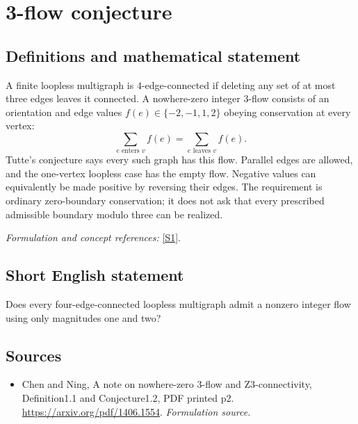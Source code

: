 \documentclass[11pt]{article}
\begin{document}
\section*{\texorpdfstring{3-flow conjecture}{3-flow conjecture}}\label{3216}
\subsection{Definitions and mathematical statement}
A finite loopless multigraph is $4$-edge-connected if deleting any set of at most three edges leaves it connected. A nowhere-zero integer $3$-flow consists of an orientation and edge values $f(e)\in\{-2,-1,1,2\}$ obeying conservation at every vertex:
\[
 \sum_{e\text{ enters }v} f(e)=\sum_{e\text{ leaves }v}f(e).
\]
Tutte's conjecture says every such graph has this flow. Parallel edges are allowed, and the one-vertex loopless case has the empty flow. Negative values can equivalently be made positive by reversing their edges. The requirement is ordinary zero-boundary conservation; it does not ask that every prescribed admissible boundary modulo three can be realized.
\par\smallskip\textit{Formulation and concept references:} \href{https://arxiv.org/pdf/1406.1554}{[S1]}.

\subsection{Short English statement}
Does every four-edge-connected loopless multigraph admit a nonzero integer flow using only magnitudes one and two?
\subsection{Sources}
\begin{itemize}
\item[S1]Chen and Ning, A note on nowhere-zero 3-flow and Z3-connectivity, Definition1.1 and Conjecture1.2, PDF printed p2.
\url{https://arxiv.org/pdf/1406.1554}.
\textit{Formulation source.}
\end{itemize}
\end{document}

